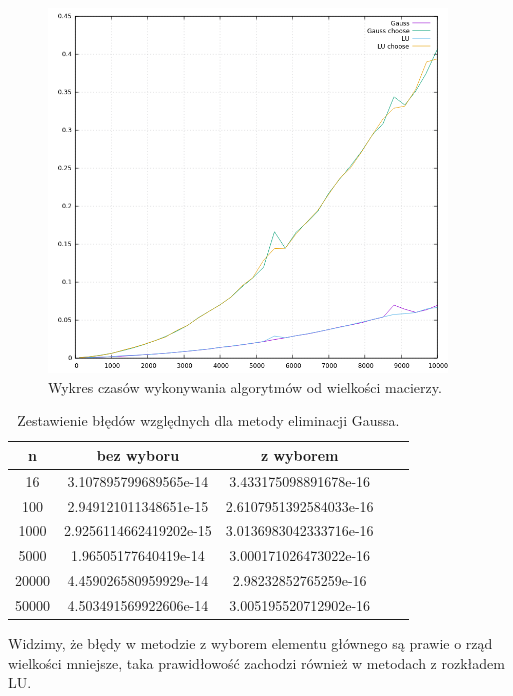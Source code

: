 \documentclass[12pt, a4paper]{article}
\begin{document}
\begin{figure}[!h]
\centering
\includegraphics[width=400px]{timePlot.png}
\caption{Wykres czasów wykonywania algorytmów od wielkości macierzy.}
\end{figure} 	


\begin{table}[!h]
        \centering
        \footnotesize
\begin{tabular}{c|c|c|c|c}
n & bez wyboru & z wyborem\\
\hline
16 &  3.107895799689565e-14 & 3.433175098891678e-16 \\
100 &  2.949121011348651e-15 & 2.6107951392584033e-16 \\
1000 &  2.9256114662419202e-15 & 3.0136983042333716e-16 \\
5000 &  1.96505177640419e-14 & 3.000171026473022e-16 \\
20000 &  4.459026580959929e-14 & 2.98232852765259e-16 \\
50000 &  4.503491569922606e-14 & 3.005195520712902e-16 
\end{tabular}
\caption{Zestawienie błędów względnych dla metody eliminacji Gaussa.}
\end{table}
Widzimy, że błędy w metodzie z wyborem elementu głównego są prawie o rząd wielkości mniejsze, taka prawidłowość zachodzi również w metodach z rozkładem LU.
\end{document}
